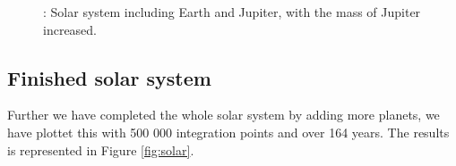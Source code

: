 \documentclass{article}
\begin{document}
\begin{figure}[H]
    \caption{: Solar system including Earth and Jupiter, with the mass of Jupiter increased.}
    \label{fig:jupiter}
    \end{figure}

\subsection{Finished solar system}
Further we have completed the whole solar system by adding more planets, we have plottet this with 500 000 integration points and over 164 years. The results is represented in Figure \ref{fig:solar}.
\end{document}
